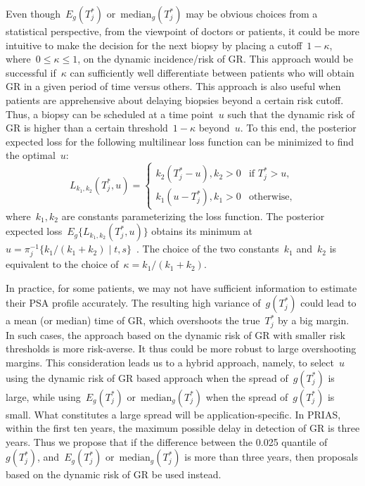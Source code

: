 Even though~$E_g(T^*_j)$ or~$\mbox{median}_g(T^*_j)$ may be obvious choices from a statistical perspective, from the viewpoint of doctors or patients, it could be more intuitive to make the decision for the next biopsy by placing a cutoff~$1 - \kappa$, where~$0 \leq \kappa \leq 1$, on the dynamic incidence/risk of GR. This approach would be successful if~$\kappa$ can sufficiently well differentiate between patients who will obtain GR in a given period of time versus others. This approach is also useful when patients are apprehensive about delaying biopsies beyond a certain risk cutoff. Thus, a biopsy can be scheduled at a time point~$u$ such that the dynamic risk of GR is higher than a certain threshold~$1 - \kappa$ beyond~$u$. To this end, the posterior expected loss for the following multilinear loss function can be minimized to find the optimal~$u$:
\begin{equation*}
\label{c2:eq:loss_dynamic_risk}
L_{k_1, k_2}(T^*_j, u) =
    \begin{cases}
      k_2(T^*_j-u), k_2>0 & \text{if } T^*_j > u,\\
      k_1(u-T^*_j), k_1>0 & \text{otherwise},
    \end{cases}       
\end{equation*}
where~$k_1, k_2$ are constants parameterizing the loss function. The posterior expected loss~$E_g\big\{L_{k_1, k_2}(T^*_j, u)\big\}$ obtains its minimum at~$u = \pi_j^{-1}\big\{k_1/{(k_1 + k_2)} \mid t,s \big\}$~\citep{robertBayesianChoice}. The choice of the two constants~$k_1$ and~$k_2$ is equivalent to the choice of~$\kappa = {k_1}/{(k_1 + k_2)}$.

In practice, for some patients, we may not have sufficient information to estimate their PSA profile accurately. The resulting high variance of~$g(T^*_j)$ could lead to a mean (or median) time of GR, which overshoots the true~$T_j^*$ by a big margin. In such cases, the approach based on the dynamic risk of GR with smaller risk thresholds is more risk-averse. It thus could be more robust to large overshooting margins. This consideration leads us to a hybrid approach, namely, to select~$u$ using the dynamic risk of GR based approach when the spread of~$g(T_j^*)$ is large, while using~$E_g(T^*_j)$ or~$\mbox{median}_g(T^*_j)$ when the spread of~$g(T_j^*)$ is small. What constitutes a large spread will be application-specific. In PRIAS, within the first ten years, the maximum possible delay in detection of GR is three years. Thus we propose that if the difference between the 0.025 quantile of~$g(T^*_j)$, and~$E_g(T^*_j)$ or~$\mbox{median}_g(T^*_j)$ is more than three years, then proposals based on the dynamic risk of GR be used instead.

